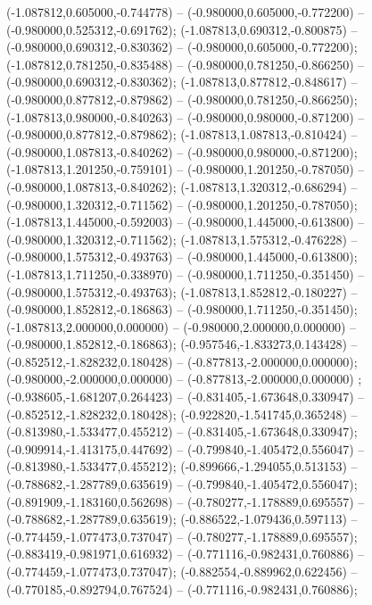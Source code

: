 (-1.087812,0.605000,-0.744778) -- (-0.980000,0.605000,-0.772200) -- (-0.980000,0.525312,-0.691762);
 (-1.087813,0.690312,-0.800875) -- (-0.980000,0.690312,-0.830362) -- (-0.980000,0.605000,-0.772200);
 (-1.087812,0.781250,-0.835488) -- (-0.980000,0.781250,-0.866250) -- (-0.980000,0.690312,-0.830362);
 (-1.087813,0.877812,-0.848617) -- (-0.980000,0.877812,-0.879862) -- (-0.980000,0.781250,-0.866250);
 (-1.087813,0.980000,-0.840263) -- (-0.980000,0.980000,-0.871200) -- (-0.980000,0.877812,-0.879862);
 (-1.087813,1.087813,-0.810424) -- (-0.980000,1.087813,-0.840262) -- (-0.980000,0.980000,-0.871200);
 (-1.087813,1.201250,-0.759101) -- (-0.980000,1.201250,-0.787050) -- (-0.980000,1.087813,-0.840262);
 (-1.087813,1.320312,-0.686294) -- (-0.980000,1.320312,-0.711562) -- (-0.980000,1.201250,-0.787050);
 (-1.087813,1.445000,-0.592003) -- (-0.980000,1.445000,-0.613800) -- (-0.980000,1.320312,-0.711562);
 (-1.087813,1.575312,-0.476228) -- (-0.980000,1.575312,-0.493763) -- (-0.980000,1.445000,-0.613800);
 (-1.087813,1.711250,-0.338970) -- (-0.980000,1.711250,-0.351450) -- (-0.980000,1.575312,-0.493763);
 (-1.087813,1.852812,-0.180227) -- (-0.980000,1.852812,-0.186863) -- (-0.980000,1.711250,-0.351450);
 (-1.087813,2.000000,0.000000) -- (-0.980000,2.000000,0.000000) -- (-0.980000,1.852812,-0.186863);
 (-0.957546,-1.833273,0.143428) -- (-0.852512,-1.828232,0.180428) -- (-0.877813,-2.000000,0.000000);
 (-0.980000,-2.000000,0.000000) -- (-0.877813,-2.000000,0.000000) ;
 (-0.938605,-1.681207,0.264423) -- (-0.831405,-1.673648,0.330947) -- (-0.852512,-1.828232,0.180428);
 (-0.922820,-1.541745,0.365248) -- (-0.813980,-1.533477,0.455212) -- (-0.831405,-1.673648,0.330947);
 (-0.909914,-1.413175,0.447692) -- (-0.799840,-1.405472,0.556047) -- (-0.813980,-1.533477,0.455212);
 (-0.899666,-1.294055,0.513153) -- (-0.788682,-1.287789,0.635619) -- (-0.799840,-1.405472,0.556047);
 (-0.891909,-1.183160,0.562698) -- (-0.780277,-1.178889,0.695557) -- (-0.788682,-1.287789,0.635619);
 (-0.886522,-1.079436,0.597113) -- (-0.774459,-1.077473,0.737047) -- (-0.780277,-1.178889,0.695557);
 (-0.883419,-0.981971,0.616932) -- (-0.771116,-0.982431,0.760886) -- (-0.774459,-1.077473,0.737047);
 (-0.882554,-0.889962,0.622456) -- (-0.770185,-0.892794,0.767524) -- (-0.771116,-0.982431,0.760886);
